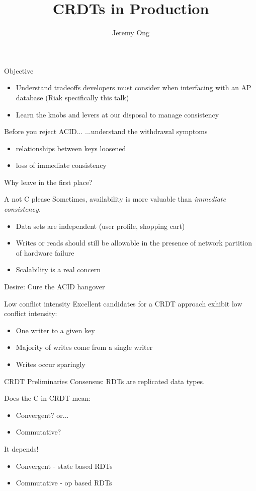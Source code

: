 \documentclass[17pt]{beamer}
\author{Jeremy Ong}
\title{CRDTs in Production}
\begin{document}
\begin{frame}
  \titlepage
\end{frame}
\begin{frame}{Objective}
  \begin{itemize}
    \item Understand tradeoffs developers must consider when
      interfacing with an AP database (Riak specifically this talk) \pause
    \item Learn the knobs and levers at our disposal to manage
      consistency
  \end{itemize}
\end{frame}
\begin{frame}{Before you reject ACID...}
  ...understand the withdrawal symptoms
  \pause
  \begin{itemize}
  \item relationships between keys loosened
      \pause
  \item loss of immediate consistency
  \end{itemize}
  \pause
  Why leave in the first place?
\end{frame}
\begin{frame}{A not C please}
  Sometimes, availability is more valuable than \em immediate \em consistency.
  \pause
  \begin{itemize}
  \item Data sets are independent (user profile, shopping cart)
      \pause
  \item Writes or reads should still be allowable in the presence of
    network partition of hardware failure
      \pause
  \item Scalability is a real concern
  \end{itemize}
  \pause
  Desire: Cure the ACID hangover
\end{frame}
\begin{frame}{Low conflict intensity}
  Excellent candidates for a CRDT approach exhibit low conflict intensity:
  \pause
  \begin{itemize}
  \item One writer to a given key
    \pause
  \item Majority of writes come from a single writer
    \pause
  \item Writes occur sparingly
  \end{itemize}
\end{frame}
\begin{frame}{CRDT Preliminaries}
  Consensus: RDTs are replicated data types.

  \pause
  Does the C in CRDT mean:
  \begin{itemize}
    \item Convergent? or...
    \item Commutative?
  \end{itemize}
  \pause
  It depends!
  \begin{itemize}
    \item Convergent - state based RDTs
    \item Commutative - op based RDTs
  \end{itemize}
\end{frame}
\end{document}
